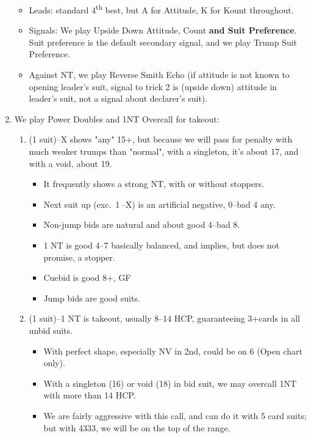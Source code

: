 \documentclass[12pt,twocolumn]{article}
\begin{document}
\begin{scriptsize}
\begin{enumerate}
\begin{itemize}[nosep]
            \item Leads: standard 4\textsuperscript{th} best, but A for Attitude, K for Kount throughout.
            \item Signals: We play Upside Down Attitude, Count \textbf{and Suit Preference}.
            Suit preference is the default secondary signal, and we play Trump Suit Preference.
            \item Against NT, we play Reverse Smith Echo (if attitude is not known to opening leader's suit, signal to trick 2 is (upside down) attitude in leader's suit, not a signal about declarer's suit).
        \end{itemize}
        \newpage
        \item We play Power Doubles and 1NT Overcall for takeout:
        \begin{enumerate}[label*=\arabic*.,nosep]
            \item (1 suit)--X shows "any" 15+, but because we will pass for penalty with much weaker trumps than "normal", with a singleton, it's about 17, and with a void, about 19.
            \begin{itemize}
                \item It frequently shows a strong NT, with or without stoppers.
                \item Next suit up (exc.\ 1\,\bs--X) is an artificial negative, 0--bad 4 any.
                \item Non-jump bids are natural and about good 4--bad 8.
                \item 1 NT is good 4--7 basically balanced, and implies, but does not promise, a stopper.
                \item Cuebid is good 8+, GF
                \item Jump bids are good suits.
            \end{itemize}
            \item (1 suit)--1 NT is takeout, usually 8--14 HCP, guaranteeing 3+cards in all unbid suits.
            \begin{itemize}
                \item With perfect shape, especially NV in 2nd, could be on 6 (Open chart only).
                \item With a singleton (16) or void (18) in bid suit, we may overcall 1NT with more than 14 HCP\@.
                \item We are fairly aggressive with this call, and can do it with 5 card suits; but with 4333, we will be on the top of the range.

\end{itemize}
\end{enumerate}
\end{enumerate}
\end{scriptsize}
\end{document}
